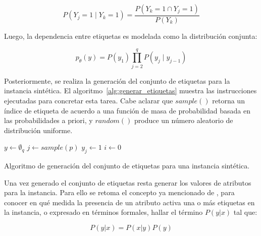 \begin{equation}
	P(Y_{j} = 1 \mid Y_{k} = 1) = \frac{P(Y_{k} = 1 \cap Y_{j} = 1)}{P(Y_{k})}
\end{equation}

Luego, la dependencia entre etiquetas es modelada como la distribución conjunta:

\begin{equation}
	\label{eq:syn_joint}
	p_{\theta}(y) = P(y_{1}) \prod_{j=2}^q P(y_{j} \mid y_{j-1})
\end{equation}

Posteriormente, se realiza la generación del conjunto de etiquetas para la
instancia sintética. El algoritmo~\ref{alg:generar_etiquetas} muestra las
instrucciones ejecutadas para concretar esta tarea. Cabe aclarar que $sample()$
retorna un índice de etiqueta de acuerdo a una función de masa de probabilidad
basada en las probabilidades a priori, y $random()$ produce un número aleatorio
de distribución uniforme.

\begin{center}
	\begin{algorithm}[H]
		\label{alg:generar_etiquetas}
		\SetAlgoLined
		\DontPrintSemicolon
		$y \gets \emptyset_{q}$\;
		$j \gets sample(p)$\;
		$y_{j} \gets 1$\;
		$i \gets 0$ \;
		\caption{Algoritmo de generación del conjunto de etiquetas para una instancia
			sintética.}
	\end{algorithm}
\end{center}

Una vez generado el conjunto de etiquetas resta generar los valores de atributos
para la instancia. Para ello se retoma el concepto ya mencionado de
, para conocer en qué medida la presencia de
un atributo activa una o más etiquetas en la instancia, o expresado en términos
formales, hallar el término $P(y|x)$ tal que:

\begin{equation}
	P(y|x) = P(x|y)P(y)
\end{equation}

